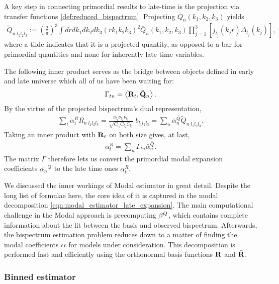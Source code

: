 A key step in connecting primordial results to late-time is the projection via transfer functions \eqref{def:reduced_bispectrum}. Projecting $\bar{Q}_n(k_1,k_2,k_3)$ yields
\begin{align}
	\tilde{Q}_{n \; l_1 l_2 l_3} := \left( \frac{2}{\pi} \right)^3 \int dr dk_1 dk_2 dk_3 \left(r k_1 k_2 k_3 \right)^2 \bar{Q}_n (k_1, k_2, k_3) \prod_{j=1}^{3} \left[ j_{l_j} (k_j r) \Delta_{l_j} (k_j) \right],
\end{align}
where a tilde indicates that it is a projected quantity, as opposed to a bar for primordial quantities and none for inherently late-time variables. 

The following inner product serves as the bridge between objects defined in early and late universe which all of us have been waiting for:
\begin{align}
	\Gamma_{tn} = \left< \mathbf{R}_{t}, \tilde{\mathbf{Q}}_n \right>.
\end{align}
By the virtue of the projected bispectrum's dual representation,
\begin{align}
	\sum_t \alpha^R_t R_{n \; l_1 l_2 l_3} = \frac{\nu_{l_1} \nu_{l_2} \nu_{l_3}}{\sqrt{C_{l_1} C_{l_2} C_{l_3}}} \; b_{l_1 l_2 l_3} = \sum_n \bar{\alpha}^{\bar{Q}}_n \tilde{Q}_{n \; l_1 l_2 l_3}.
\end{align}
Taking an inner product with $\mathbf{R}_t$ on both size gives, at last,
\begin{align}
	\alpha^R_t = \sum_n \Gamma_{tn} \bar{\alpha}^{\bar{Q}}_n.
\end{align}
The matrix $\Gamma$ therefore lets us convert the primordial modal expansion coefficients $\bar{\alpha_n}^{\bar{Q}}$ to the late time ones $\alpha_t^{R}$.

\hspace{10pt}

We discussed the inner workings of Modal estimator in great detail. Despite the long list of formulae here, the core idea of it is captured in the modal decomposition \eqref{eqn:modal_estimator_late_expansion}. The main computational challenge in the Modal approach is precomputing $\mathbf{\beta}^Q$, which contains complete information about the fit between the basis and observed bispectrum. Afterwards, the bispectrum estimation problem reduces down to a matter of finding the modal coefficients $\mathbf{\alpha}$ for models under consideration. This decomposition is performed fast and efficiently using the orthonormal basis functions $\mathbf{R}$ and $\bar{\mathbf{R}}$.

\subsubsection*{Binned estimator}

